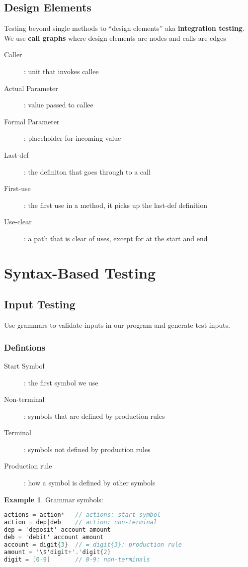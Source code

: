 \documentclass[]{article}
\theoremstyle{definition}
\newtheorem{ex}{Example}[section]
\begin{document}
		\subsection{Design Elements}
			Testing beyond single methods to ``design elements'' aka \textbf{integration testing}. We use \textbf{call graphs} where design elements are nodes and calls are edges
			\begin{description}
				\item[Caller]: unit that invokes callee
				\item[Actual Parameter]: value passed to callee
				\item[Formal Parameter]: placeholder for incoming value
				\item[Last-def]: the definiton that goes through to a call
				\item[First-use]: the first use in a method, it picks up the last-def definition 
				\item[Use-clear]: a path that is clear of uses, except for at the start and end
			\end{description}
	\section{Syntax-Based Testing}
		\subsection{Input Testing}
			Use grammars to validate inputs in our program and generate test inputs.
			\subsubsection{Defintions}
				\begin{description}
					\item[Start Symbol]: the first symbol we use
					\item[Non-terminal]: symbols that are defined by production rules
					\item[Terminal]: symbols not defined by production rules
					\item[Production rule]: how a symbol is defined by other symbols
				\end{description}
				\begin{ex}
					Grammar symbols:
					\begin{lstlisting}[language=C]
actions = action*	// actions: start symbol
action = dep|deb	// action: non-terminal
dep = 'deposit' account amount		
deb = 'debit' account amount		
account = digit{3}	// = digit{3}: production rule
amount = '\$'digit+'.'digit{2}
digit = [0-9]		// 0-9: non-terminals
					\end{lstlisting}
				\end{ex}
\end{document}
